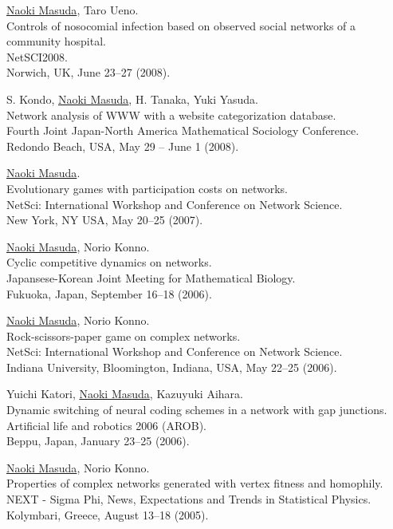 \documentclass[11pt,letter]{article}
\begin{document}
\begin{etaremune}
\item \underline{Naoki Masuda}, Taro Ueno.\\
Controls of nosocomial infection based on observed social networks of a community hospital.\\
NetSCI2008.\\
Norwich, UK, June 23--27 (2008).

\item S. Kondo, \underline{Naoki Masuda}, H. Tanaka, Yuki Yasuda.\\
Network analysis of WWW with a website categorization database.\\
Fourth Joint Japan-North America Mathematical Sociology Conference.\\
Redondo Beach, USA, May 29 -- June 1 (2008).

\item \underline{Naoki Masuda}.\\
Evolutionary games with participation costs on networks.\\
NetSci: International Workshop and Conference on Network Science.\\
New York, NY USA, May 20--25 (2007).

\item \underline{Naoki Masuda}, Norio Konno.\\
Cyclic competitive dynamics on networks.\\
Japansese-Korean Joint Meeting for Mathematical Biology.\\
Fukuoka, Japan, September 16--18 (2006).

\item \underline{Naoki Masuda}, Norio Konno.\\
Rock-scissors-paper game on complex networks.\\
NetSci: International Workshop and Conference on Network Science.\\
Indiana University, Bloomington, Indiana, USA, May 22--25 (2006).

\item Yuichi Katori, \underline{Naoki Masuda}, Kazuyuki Aihara.\\
Dynamic switching of neural coding schemes in a network with gap junctions.\\
Artificial life and robotics 2006 (AROB).\\
Beppu, Japan, January 23--25 (2006).

\item \underline{Naoki Masuda}, Norio Konno.\\
Properties of complex networks generated with vertex fitness and homophily.\\
NEXT - Sigma Phi, News, Expectations and Trends in Statistical Physics.\\
Kolymbari, Greece, August 13--18 (2005).


\end{etaremune}
\end{document}
